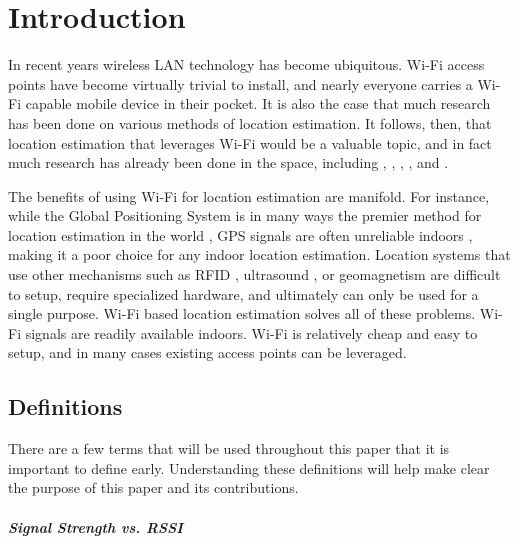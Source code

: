 \chapter{Introduction}
\label{introduction}
%


In recent years wireless LAN technology has become ubiquitous. Wi-Fi access points have become virtually trivial to install, and nearly everyone carries a Wi-Fi capable mobile device in their pocket. It is also the case that much research has been done on various methods of location estimation. It follows, then, that location estimation that leverages Wi-Fi would be a valuable topic, and in fact much research has already been done in the space, including \cite{ito2005bayesian}, \cite{liu2007survey}, \cite{kawaguchi2009wifi}, \cite{hotta2012robust}, and \cite{nagaosa2012dept}. 

The benefits of using Wi-Fi for location estimation are manifold. For instance, while the Global Positioning System is in many ways the premier method for location estimation in the world \cite{bajaj2002gps}, GPS signals are often unreliable indoors \cite{xiong2012towards}, making it a poor choice for any indoor location estimation. Location systems that use other mechanisms such as RFID \cite{toplan2012rfid}, ultrasound \cite{priyantha2005cricket}, or geomagnetism \cite{chung2011indoor} are difficult to setup, require specialized hardware, and ultimately can only be used for a single purpose. Wi-Fi based location estimation solves all of these problems. Wi-Fi signals are readily available indoors. Wi-Fi is relatively cheap and easy to setup, and in many cases existing access points can be leveraged.

\section{Definitions}
%

There are a few terms that will be used throughout this paper that it is important to define early. Understanding these definitions will help make clear the purpose of this paper and its contributions. 

\paragraph{Signal Strength vs. RSSI}

